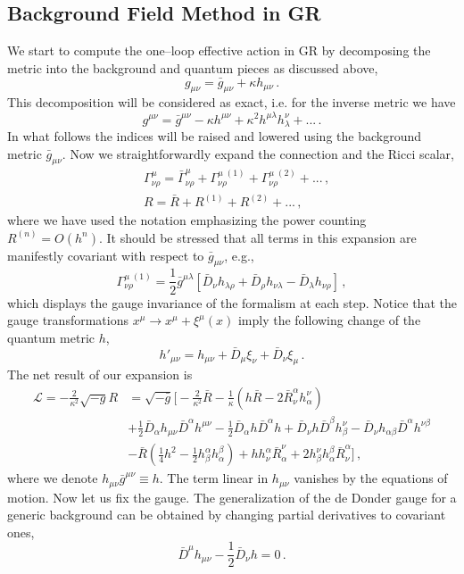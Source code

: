 \documentclass[12pt]{article}
\newcommand{\be}{\begin{equation}}
\newcommand{\ee}{\end{equation}}
\newcommand\m{\mu}
\newcommand\G{\Gamma}
\newcommand\n{\nu}
\renewcommand\r{\rho}
\renewcommand\a{\alpha}
\renewcommand\b{\beta}
\renewcommand\l{\lambda}
\begin{document}
\subsection{Background Field Method in GR}

We start to compute the one--loop effective action in GR by
decomposing the metric into the background and quantum pieces as discussed above,
\be
g_{\m \n}=\bar g_{\m \n} +\kappa h_{\m \n}\,.
\ee
This decomposition will be considered as exact, i.e. for the inverse metric we have
\be
 g^{\m \n}=\bar g^{\m \n} -\kappa h^{\m \n}+\kappa^2 h^{\m\l}h_{\l}^\n+...\,.
\ee
In what follows the indices will be raised and lowered using the background metric $\bar g_{\m \n}$.
Now we straightforwardly expand the connection and the Ricci scalar,
\be
\begin{split}
& \G^\m_{\n \r}=\bar \G^\m_{\n \r}+\G^{\m\;(1)}_{\n \r}+\G^{\m\;(2)}_{\n \r}+...\,,\\
& R=\bar R+R^{(1)}+R^{(2)}+...\,,
\end{split}
\ee
where we have used the notation emphasizing the power counting $R^{(n)}=O( h^n)$.
It should be stressed that all terms in this expansion are manifestly covariant with respect to $\bar g_{\m \n}$,
e.g.,
\be
 \G^{\m\;(1)}_{\n \r}=\frac{1}{2}\bar g^{\m \l}[\bar D_{\n}h_{\l \r}+\bar D_{\r}h_{\n \l}-\bar D_{\l}h_{\n \r}]\,,
\ee
which displays the gauge invariance of the formalism at each step.
Notice that the gauge transformations $x^\m\to x^\m+\xi^\m(x)$
imply the following change of the quantum metric $h$,
\be
 h'_{\m \n}=h_{\m \n}+\bar D_\m\xi_\n+\bar D_\n\xi_\m\,.
\ee
The net result of our expansion is
\be
\label{eq:quadraticGR}
\begin{split}
\mathcal{L}=-\frac{2}{\kappa^2}\sqrt{-g}R&=\sqrt{-\bar g}\Big[
-\frac{2}{\kappa^2}\bar R-\frac{1}{\kappa}\left(h\bar R-2\bar R_{\n}^\a h_\a^\n \right)
\\
&+\frac{1}{2}\bar D_\a h_{\m \n} \bar D^\a h^{\m \n}-\frac{1}{2}\bar D_\a h \bar D^\a h
+\bar D_\n h \bar D^\b h^\n_\b-\bar D_\n h_{\a \b} \bar D^\a h^{\n \b}\\
&-\bar R\left(\frac{1}{4}h^2-\frac{1}{2}h^\a_\b h^\b_\a \right)
+h h^\a_\n \bar R^\n_\a + 2h^\n_\b h^\b_\a \bar R^\a_\n \Big]\,,
\end{split}
\ee
where we denote $h_{\m\n}\bar g^{\m\n}\equiv h$.
The term linear in $h_{\m\n}$ vanishes by the equations of motion.
Now let us fix the gauge. The generalization of the de Donder gauge for
a generic background can be obtained by changing partial derivatives to
covariant ones,
\be
\bar D^\mu h_{\m \n}-\frac{1}{2}\bar D_\n h=0\,.
\ee
\end{document}
